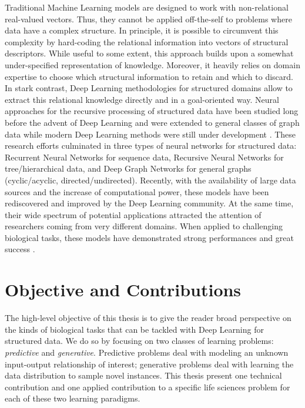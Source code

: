 Traditional Machine Learning models are designed to work with non-relational real-valued vectors. Thus, they cannot be applied off-the-self to problems where data have a complex structure. In principle, it is possible to circumvent this complexity by hard-coding the relational information into vectors of structural descriptors. While useful to some extent, this approach builds upon a somewhat under-specified representation of knowledge. Moreover, it heavily relies on domain expertise to choose which structural information to retain and which to discard. In stark contrast, Deep Learning methodologies for structured domains allow to extract this relational knowledge directly and in a goal-oriented way. Neural approaches for the recursive processing of structured data have been studied long before the advent of Deep Learning \cite{elman1990rnn,hochreiter1997lstm,sperduti1997generalizedneuron,frasconi1998general} and were extended to general classes of graph data while modern Deep Learning methods were still under development \citep{micheli2009nn4g,scarselli2009gnn}. These research efforts culminated in three types of neural networks for structured data: Recurrent Neural Networks for sequence data, Recursive Neural Networks for tree/hierarchical data, and Deep Graph Networks for general graphs (\eg cyclic/acyclic, directed/undirected). Recently, with the availability of large data sources and the increase of computational power, these models have been rediscovered and improved by the Deep Learning community. At the same time, their wide spectrum of potential applications attracted the attention of researchers coming from very different domains. When applied to challenging biological tasks, these models have demonstrated strong performances and great success
\cite{bianucci2000applicationcascorstructurechemistry,baldi2013recursiveneuralnets,duvenaud2015molecularfingerprint,bradshaw2019moleculechef}.

\section{Objective and Contributions}
The high-level objective of this thesis is to give the reader broad perspective on the kinds of biological tasks that can be tackled with Deep Learning for structured data. We do so by focusing on two classes of learning problems: \emph{predictive} and \emph{generative}. Predictive problems deal with modeling an unknown input-output relationship of interest; generative problems deal with learning the data distribution to sample novel instances. This thesis present one technical contribution and one applied contribution to a specific life sciences problem for each of these two learning paradigms.

